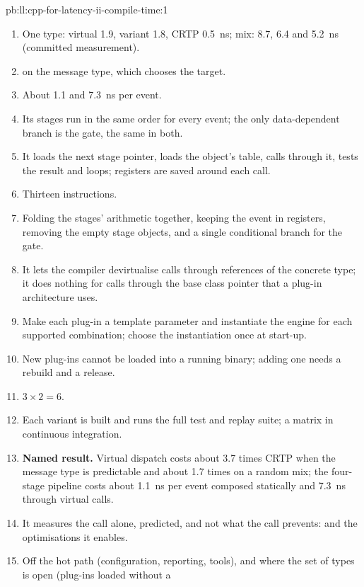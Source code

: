 \begin{solution}{pb:ll:cpp-for-latency-ii-compile-time:1}
\begin{enumerate}
\item One type: virtual 1.9, variant 1.8, CRTP \qty{0.5}{\nano\second}; mix: 8.7, 6.4 and \qty{5.2}{\nano\second} (committed
measurement).
\item {} on the message type, which chooses the target.
\item About 1.1 and \qty{7.3}{\nano\second} per event.
\item Its stages run in the same order for every event; the only data-dependent branch is the gate, the same in both.
\item It loads the next stage pointer, loads the object's table, calls through it, tests the result and loops; registers
are saved around each call.
\item Thirteen instructions.
\item Folding the stages' arithmetic together, keeping the event in registers, removing the empty stage objects, and a
single conditional branch for the gate.
\item It lets the compiler devirtualise calls through references of the concrete type; it does nothing for calls through
the base class pointer that a plug-in architecture uses.
\item Make each plug-in a template parameter and instantiate the engine for each supported combination; choose the
instantiation once at start-up.
\item New plug-ins cannot be loaded into a running binary; adding one needs a rebuild and a release.
\item $3 \times 2 = 6$.
\item Each variant is built and runs the full test and replay suite; a matrix in continuous integration.
\item \textbf{Named result.} Virtual dispatch costs about 3.7 times CRTP when the message type is predictable and about 1.7
times on a random mix; the four-stage pipeline costs about \qty{1.1}{\nano\second} per event composed statically and
\qty{7.3}{\nano\second} through virtual calls.
\item It measures the call alone, predicted, and not what the call prevents:  and the optimisations it enables.
\item Off the hot path (configuration, reporting, tools), and where the set of types is open (plug-ins loaded without a

\end{enumerate}
\end{solution}
